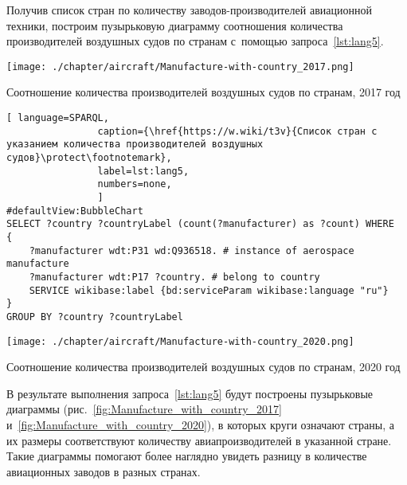 
Получив список стран по количеству заводов-производителей авиационной техники, 
построим пузырьковую диаграмму 
соотношения количества производителей воздушных судов по странам 
с~помощью запроса~\ref{lst:lang5}.

\begin{marginfigure}[0\baselineskip]
\centering
	\texttt{[image: ./chapter/aircraft/Manufacture-with-country\_2017.png]}
	\caption{Соотношение количества производителей воздушных судов по странам, 2017 год}
	\label{fig:Manufacture_with_country_2017}
\end{marginfigure}


\begin{lstlisting}[ language=SPARQL, 
                caption={\href{https://w.wiki/t3v}{Список стран с указанием количества производителей воздушных судов}\protect\footnotemark}, 
                label=lst:lang5, 
                numbers=none,
                ]
#defaultView:BubbleChart
SELECT ?country ?countryLabel (count(?manufacturer) as ?count) WHERE
{
    ?manufacturer wdt:P31 wd:Q936518. # instance of aerospace manufacture
  	?manufacturer wdt:P17 ?country. # belong to country
    SERVICE wikibase:label {bd:serviceParam wikibase:language "ru"}
}
GROUP BY ?country ?countryLabel
\end{lstlisting}

\begin{marginfigure}
\centering
	\texttt{[image: ./chapter/aircraft/Manufacture-with-country\_2020.png]}
	\caption{Соотношение количества производителей воздушных судов по странам, 2020 год}
	\label{fig:Manufacture_with_country_2020}
\end{marginfigure}

В результате выполнения запроса~\ref{lst:lang5} будут построены пузырьковые диаграммы 
(рис.~\ref{fig:Manufacture_with_country_2017} и~\ref{fig:Manufacture_with_country_2020}), 
в которых круги означают страны, 
а их размеры соответствуют количеству авиапроизводителей в указанной стране. 
Такие диаграммы помогают более наглядно увидеть разницу в количестве авиационных заводов в разных странах.


